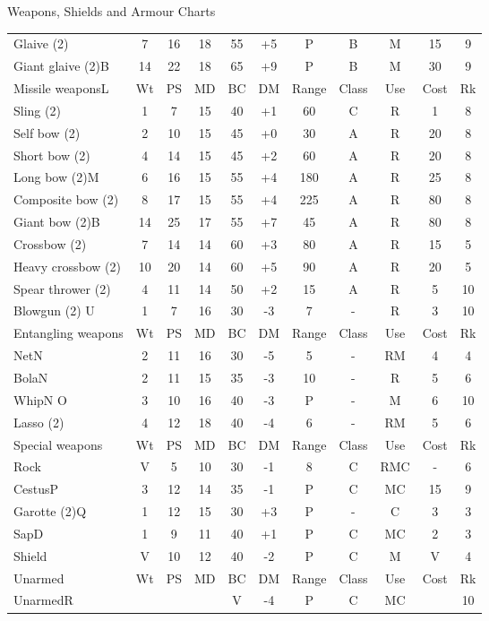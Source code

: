 \begin{Tables}{Weapons, Shields and Armour Charts}
\begin{tabularx}{\linewidth}{Xcccccccccc}
Glaive (2)		& 7	& 16	& 18	& 55	& +5	& P	& B	& M	& 15	& 9	\\
Giant glaive (2)B	& 14	& 22	& 18	& 65	& +9	& P	& B	& M	& 30	& 9	\\
Missile weaponsL	& Wt	& PS	& MD	& BC	& DM	& Range	& Class	& Use	& Cost	& Rk	\\
Sling (2)		& 1	& 7	& 15	& 40	& +1	& 60	& C	& R	& 1	& 8	\\
Self bow (2)		& 2	& 10	& 15	& 45	& +0	& 30	& A	& R	& 20	& 8	\\
Short bow (2)		& 4	& 14	& 15	& 45	& +2	& 60	& A	& R	& 20	& 8	\\
Long bow (2)M		& 6	& 16	& 15	& 55	& +4	& 180	& A	& R	& 25	& 8	\\
Composite bow (2)	& 8	& 17	& 15	& 55	& +4	& 225	& A	& R	& 80	& 8	\\
Giant bow (2)B		& 14	& 25	& 17	& 55	& +7	& 45	& A	& R	& 80	& 8	\\
Crossbow (2)		& 7	& 14	& 14	& 60	& +3	& 80	& A	& R	& 15	& 5	\\
Heavy crossbow (2)	& 10	& 20	& 14	& 60	& +5	& 90	& A	& R	& 20	& 5	\\
Spear thrower (2)	& 4	& 11	& 14	& 50	& +2	& 15	& A	& R	& 5	& 10	\\
Blowgun (2) U		& 1	& 7	& 16	& 30	& -3	& 7	& -	& R	& 3	& 10	\\
Entangling weapons	& Wt	& PS	& MD	& BC	& DM	& Range	& Class	& Use	& Cost	& Rk	\\
NetN			& 2	& 11	& 16	& 30	& -5	& 5	& -	& RM	& 4	& 4	\\ 
BolaN			& 2	& 11	& 15	& 35	& -3	& 10	& -	& R	& 5	& 6	\\
WhipN O			& 3	& 10	& 16	& 40	& -3	& P	& -	& M	& 6	& 10	\\
Lasso (2)		& 4	& 12	& 18	& 40	& -4	& 6	& -	& RM	& 5	& 6	\\
Special weapons		& Wt	& PS	& MD	& BC	& DM	& Range	& Class	& Use	& Cost	& Rk	\\
Rock			& V	& 5	& 10	& 30	& -1	& 8	& C	& RMC	& -	& 6	\\
CestusP			& 3	& 12	& 14	& 35	& -1	& P	& C	& MC	& 15	& 9	\\
Garotte (2)Q		& 1	& 12	& 15	& 30	& +3	& P	& -	& C	& 3	& 3	\\
SapD			& 1	& 9	& 11	& 40	& +1	& P	& C	& MC	& 2	& 3	\\
Shield			& V	& 10	& 12	& 40	& -2	& P	& C	& M	& V	& 4	\\
Unarmed			& Wt	& PS	& MD	& BC	& DM	& Range	& Class	& Use	& Cost	& Rk	\\
UnarmedR		&	& 	& 	& V	& -4	& P	& C	& MC	& 	& 10	\\
\end{tabularx}



\end{Tables}
